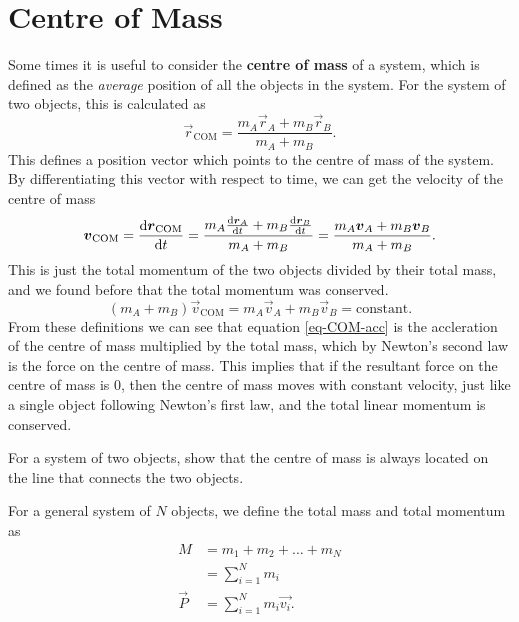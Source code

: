 \documentclass[../classical_mechanics.tex]{subfiles}
\begin{document}
    \section{Centre of Mass}\label{sec:centre-of-mass}
        Some times it is useful to consider the \textbf{centre of mass} of a system, which is defined as the \textit{average} position of all the objects in the system.
        For the system of two objects, this is calculated as
        \begin{equation}
            \vec{r}_\text{COM}=\frac{m_A\vec{r}_A+m_B\vec{r}_B}{m_A+m_B}.
        \end{equation}
        This defines a position vector which points to the centre of mass of the system.
        By differentiating this vector with respect to time, we can get the velocity of the centre of mass
        \begin{equation}
            \vec{v}_\text{COM}=\dv{\vec{r}_\text{COM}}{t}=\frac{m_A\dv{\vec{r}_A}{t}+m_B\dv{\vec{r}_B}{t}}{m_A+m_B}=\frac{m_A\vec{v}_A+m_B\vec{v}_B}{m_A+m_B}.
        \end{equation}
        This is just the total momentum of the two objects divided by their total mass, and we found before that the total momentum was conserved.
        \begin{equation}
            (m_A+m_B)\vec{v}_\text{COM}=m_A\vec{v}_A+m_B\vec{v}_B=\text{constant}.
        \end{equation}
        From these definitions we can see that equation \ref{eq-COM-acc} is the accleration of the centre of mass multiplied by the total mass, which by Newton's second law is the force on the centre of mass.
        This implies that if the resultant force on the centre of mass is 0, then the centre of mass moves with constant velocity, just like a single object following Newton's first law, and the total linear momentum is conserved.
        \begin{example}
            For a system of two objects, show that the centre of mass is always located on the line that connects the two objects.
        \end{example}

        For a general system of $N$ objects, we define the total mass and total momentum as
        \begin{align}
            M&=m_1+m_2+\dots+m_N\\
            &=\sum_{i=1}^{N}m_i\\
            \vec{P}&=\sum_{i=1}^{N}m_i\vec{v_i}.
        \end{align}
\end{document}
